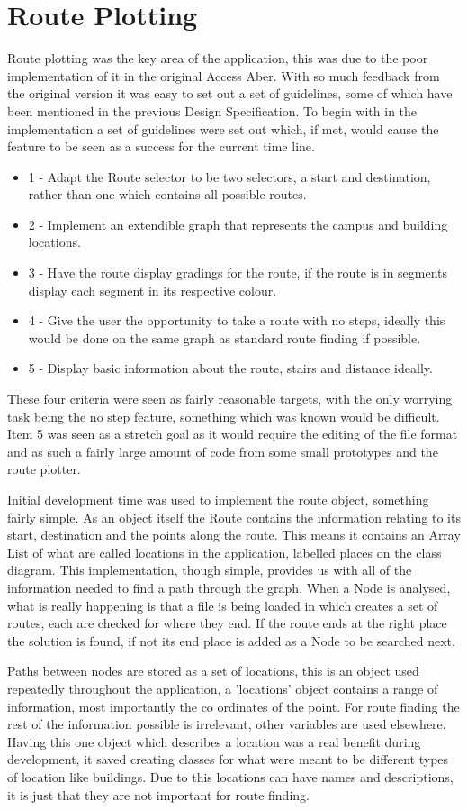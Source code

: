 \section{Route Plotting}
Route plotting was the key area of the application, this was due to the poor implementation of it in the original Access Aber. With so much feedback from the original version it was easy to set out a set of guidelines, some of which have been mentioned in the previous Design Specification. To begin with in the implementation a set of guidelines were set out which, if met, would cause the feature to be seen as a success for the current time line. 

\begin{itemize}
	\item 1 - Adapt the Route selector to be two selectors, a start and destination, rather than one which contains all possible routes.
	\item 2 - Implement an extendible graph that represents the campus and building locations.
	\item 3 - Have the route display gradings for the route, if the route is in segments display each segment in its respective colour.
	\item 4 - Give the user the opportunity to take a route with no steps, ideally this would be done on the same graph as standard route finding if possible.
	\item 5 - Display basic information about the route, stairs and distance ideally.  
\end{itemize}

These four criteria were seen as fairly reasonable targets, with the only worrying task being the no step feature, something which was known would be difficult. Item 5 was seen as a stretch goal as it would require the editing of the file format and as such a fairly large amount of code from some small prototypes and the route plotter.

Initial development time was used to implement the route object, something fairly simple. As an object itself the Route contains the information relating to its start, destination and the points along the route. This means it contains an Array List of what are called locations in the application, labelled places on the class diagram. This implementation, though simple, provides us with all of the information needed to find a path through the graph. When a Node is analysed, what is really happening is that a file is being loaded in which creates a set of routes, each are checked for where they end. If the route ends at the right place the solution is found, if not its end place is added as a Node to be searched next. 

Paths between nodes are stored as a set of locations, this is an object used repeatedly throughout the application, a 'locations' object contains a range of information, most importantly the co ordinates of the point. For route finding the rest of the information possible is irrelevant, other variables are used elsewhere. Having this one object which describes a location was a real benefit during development, it saved creating classes for what were meant to be different types of location like buildings. Due to this locations can have names and descriptions, it is just that they are not important for route finding. 
